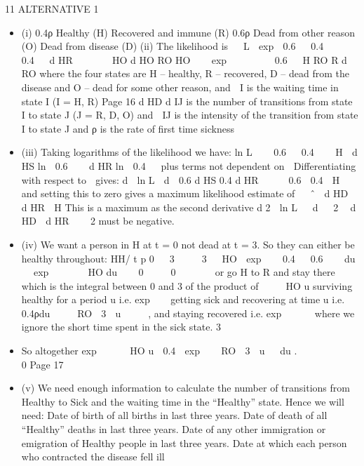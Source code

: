 \documentclass[a4paper,12pt]{article}
\begin{document}
11
ALTERNATIVE 1
\begin{itemize}
\item (i)
0.4ρ
Healthy
(H)
Recovered and
immune
(R)
0.6ρ
Dead from other
reason (O)
Dead from disease
(D)
(ii)
The likelihood is
 
L  exp  0.6   0.4   
 0.4  
d HR
     
HO
d HO
RO
HO
   exp        0.6  
H
RO
R
d RO
where
the four states are H – healthy, R – recovered, D – dead from
the disease and O – dead for some other reason, and
 I is the waiting time in state I (I = H, R)
Page 16
d HD %
d IJ is the number of transitions from state I to state J (J = R, D, O)
and  IJ is the intensity of the transition from state I to state J and ρ is
the rate of first time sickness
\item (iii)
Taking logarithms of the likelihood we have:
ln L    0.6   0.4    H  d HS ln  0.6    d HR ln  0.4   plus terms not
dependent on 
Differentiating with respect to  gives:
d  ln L 
d 
0.6 d HS 0.4 d HR
  

0.6 
0.4 
H
and setting this to zero gives a maximum likelihood estimate of 
 ˆ 
d HD  d HR
 H
This is a maximum as the second derivative
d 2  ln L 
 d   2

d HD  d HR
   2
must
be negative.
\item (iv)
We want a person in H at t = 0 not dead at t = 3.
So they can either be healthy throughout:
HH/
t p 0
  3
 
  3
 
HO
 exp    0.4   0.6    du   exp       HO du 
  0
 
  0
 




or go H to R and stay there which is the integral between
0 and 3 of the product of
 
 
HO
u
surviving healthy for a period u i.e. exp  
getting sick and recovering at time u i.e. 0.4ρdu
  

RO
 3  u     ,
and staying recovered i.e. exp    

where we ignore the short time spent in the sick state.
3
 
 
  

\item So altogether exp      HO u  0.4  exp    RO  3  u   du .
 
 
 
 

0
Page 17 %
\item (v)
We need enough information to calculate the number of transitions from
Healthy to Sick and the waiting time in the “Healthy” state. Hence we will
need:
Date of birth of all births in last three years.
Date of death of all “Healthy” deaths in last three years.
Date of any other immigration or emigration of Healthy people in last three
years.
Date at which each person who contracted the disease fell ill

\end{itemize}
\end{document}
